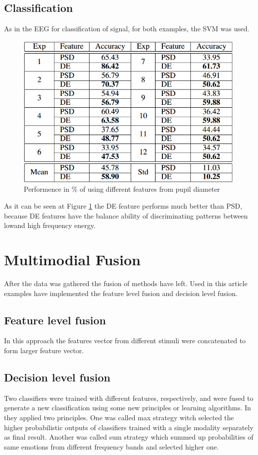 \documentclass[10pt,journal,compsoc,twoside]{IEEEtran}
\newcommand{\Ref}[2]{#2 \ref{#1}}
\begin{document}
\subsection{Classification}
As in the EEG for classification of signal, for both examples, the SVM was used.
\begin{figure}[ht]
	\centering
	\includegraphics[width=1.0\linewidth]{performanceOfClassifierPupil1}
	\caption{ Performence in \% of using different features from pupil diameter \cite{WeiLongBoNanBaoLiang2014}}
	\label{fig:performanceOfClassifierPupil1}
\end{figure}
As it can be seen at \Ref{fig:performanceOfClassifierPupil1}{Figure} the DE feature performs much better than PSD, because DE features have the balance ability of discriminating patterns between  lowand high frequency energy.
 \section{Multimodial Fusion} 
After the data was gathered the fusion of methods have left. Used in this article examples have implemented the feature level fusion and decision level fusion. 
\subsection{Feature level fusion}
In this approach the features vector from different stimuli were concatenated to form larger feature vector.
\subsection{Decision level fusion}
Two classifiers were trained with different features, respectively, and were fused to generate a new classification using some new principles or learning algorithms. In \cite{WeiLongBoNanBaoLiang2014} they applied two principles. One was called max strategy witch selected the higher probabilistic outputs of classifiers trained with a single modality separately as final result. Another was called sum strategy which summed up probabilities of same emotions from different frequency bands and selected higher one.
\end{document}
